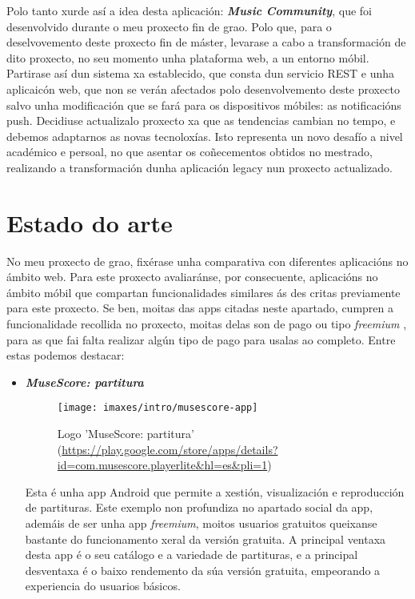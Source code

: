 Polo tanto xurde así a idea desta aplicación: \textbf{\textit{Music Community}}, que foi desenvolvido durante o meu proxecto fin de grao. Polo que, para o deselvovemento deste proxecto fin de máster, levarase a cabo a transformación de dito proxecto, no seu momento unha plataforma web, a un entorno móbil.  Partirase así dun sistema xa establecido, que consta dun servicio REST e unha aplicaicón web, que non se verán afectados polo desenvolvemento deste proxecto salvo unha modificación que se fará para os dispositivos móbiles: as notificacións push. Decidiuse actualizalo proxecto xa que as tendencias cambian no tempo, e debemos adaptarnos as novas tecnoloxías. Isto representa un novo desafío a nivel académico e persoal, no que asentar os coñecementos obtidos no mestrado, realizando a transformación dunha aplicación legacy nun proxecto actualizado.

\section{Estado do arte}
\label{sec:estado-arte}

No meu proxecto de grao, fixérase unha comparativa con diferentes aplicacións no ámbito web. Para este proxecto avaliaránse, por consecuente, aplicacións no ámbito móbil que compartan funcionalidades similares ás des critas previamente para este proxecto. Se ben, moitas das apps citadas neste apartado, cumpren a funcionalidade recollida no proxecto, moitas delas son de pago ou tipo \textit{freemium} , para as que fai falta realizar algún tipo de pago para usalas ao completo. Entre estas podemos destacar:

\begin{itemize}
	\item \textbf{\textit{MuseScore: partitura}} 
	
	\begin{figure}[h!]
		\centering
		\texttt{[image: imaxes/intro/musescore-app]}
		\caption{Logo 'MuseScore: partitura' (\url{https://play.google.com/store/apps/details?id=com.musescore.playerlite&hl=es&pli=1})}
	\end{figure}
	
	Esta é unha app Android que permite a xestión, visualización e reproducción de partituras. Este exemplo non profundiza no apartado social da app, ademáis de ser unha app  \textit{freemium}, moitos usuarios gratuitos queixanse bastante do funcionamento xeral da versión gratuita.
	A principal ventaxa desta app é o seu catálogo e a variedade de partituras, e a principal desventaxa é o baixo rendemento da súa versión gratuita, empeorando a experiencia do usuarios básicos. 

\end{itemize}

